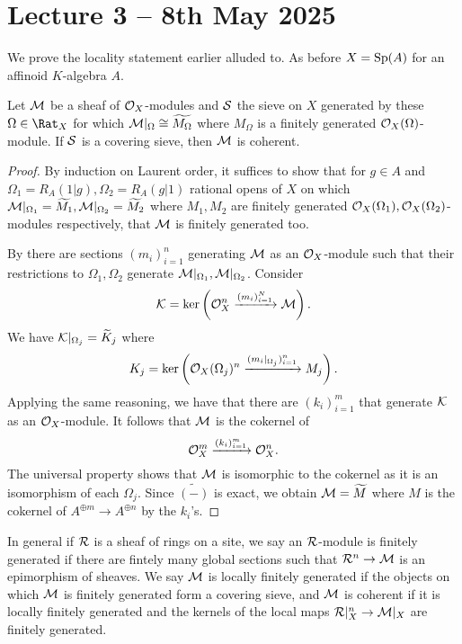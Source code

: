 \section{Lecture 3 -- 8th May 2025}\label{sec: lecture 3}
We prove the locality statement earlier alluded to. As before
$X=\mathrm{Sp}(A)$ for an affinoid $K$-algebra $A$.
\begin{proposition}\label{prop: coherent module is local}
    Let $\mathcal{M}$ be a sheaf of $\mathcal{O}_X$-modules and $\mathcal{S}$ 
the sieve on $X$ generated by these $\Omega\in \Rat_X$ 
for which $\mathcal{M}|_{\Omega}\cong \widetilde{M_{\Omega}}$ where $M_{\Omega}$ is a finitely generated $\mathcal{O}_{X}(\Omega)$-module. If $\mathcal{S}$ is
a covering sieve, then $\mathcal{M}$ is coherent. 
\end{proposition}
\begin{proof}
    By induction on Laurent order, it suffices to show that for $g\in A$ and $\Omega_{1}=R_{A}(1|g),\Omega_{2}=R_{A}(g|1)$ rational opens of $X$ on which $\mathcal{M}|_{\Omega_{1}}=\widetilde{M_{1}},\mathcal{M}|_{\Omega_{2}}=\widetilde{M_{2}}$
where $M_1, M_2$ are finitely generated $\mathcal{O}_{X}(\Omega_{1}),\mathcal{O}_{X}(\Omega_{2})$-modules respectively, that $\mathcal{M}$ is finitely generated too. 

    By  there are sections $(m_{i})_{i=1}^{n}$ generating $\mathcal{M}$ as an $\mathcal{O}_{X}$-module such that their restrictions to $\Omega_{1},\Omega_{2}$ generate $\mathcal{M}|_{\Omega_{1}},\mathcal{M}|_{\Omega_{2}}$. Consider 
    $$\mathcal{K}=\ker\left(\mathcal{O}_{X}^{n}\xrightarrow{(m_{i})_{i=1}^{N}}\mathcal{M}\right).$$
    We have $\mathcal{K}|_{\Omega_{j}}= \widetilde{K}_{j}$ where 
    $$K_{j}=\ker\left(\mathcal{O}_{X}(\Omega_{j})^{n}\xrightarrow{(m_{i}|_{\Omega_{j}})_{i=1}^{n}} M_{j}\right).$$
    Applying the same reasoning, we have that there are $(k_{i})_{i=1}^{m}$ that generate $\mathcal{K}$ as an $\mathcal{O}_{X}$-module. It follows that $\mathcal{M}$ is the cokernel of 
    $$\mathcal{O}_{X}^{m}\xrightarrow{(k_{i})_{i=1}^{m}}\mathcal{O}_{X}^{n}.$$
    The universal property shows that $\mathcal{M}$ is isomorphic to the cokernel as it is an isomorphism of each $\Omega_{j}$. Since $\widetilde{(-)}$ is exact, we obtain $\mathcal{M}=\widetilde{M}$ where $M$ is the cokernel of $A^{\oplus m}\to A^{\oplus n}$ by the $k_{i}$'s. 
\end{proof}
\begin{remark}\label{rmk: finitely generated modules over sites}
    In general if $\mathcal{R}$ is a sheaf of rings on a site, we say an $\mathcal{R}$-module is finitely generated if there are fintely many global sections such that $\mathcal{R}^{n}\to\mathcal{M}$ is an epimorphism of sheaves. We say $\mathcal{M}$ is locally finitely generated if the objects on which $\mathcal{M}$ is finitely generated form a covering sieve, and $\mathcal{M}$ is coherent if it is locally finitely generated and the kernels of the local maps $\mathcal{R}|_{X}^{n}\to\mathcal{M}|_{X}$ are finitely generated. 
\end{remark}
